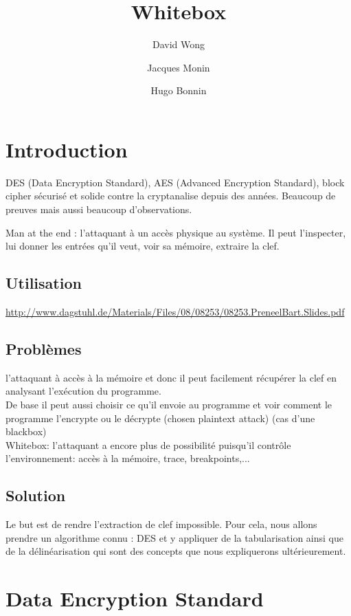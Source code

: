 \documentclass[a4paper,12pt]{article}
\author{David Wong
  \and Jacques Monin
  \and Hugo Bonnin}
\title{Whitebox}
\begin{document}
\maketitle
\newpage
\tableofcontents
\newpage


\section{Introduction}

DES (Data Encryption Standard), AES (Advanced Encryption Standard), block cipher sécurisé et solide contre la cryptanalise depuis des années. Beaucoup de preuves mais aussi beaucoup d'observations.

Man at the end : l'attaquant à un accès physique au système. Il peut l'inspecter, lui donner les entrées qu'il veut, voir sa mémoire, extraire la clef.
	
\subsection{Utilisation}

\url{http://www.dagstuhl.de/Materials/Files/08/08253/08253.PreneelBart.Slides.pdf}

\subsection{Problèmes}

l'attaquant à accès à la mémoire et donc il peut facilement récupérer la clef en analysant l'exécution du programme.\\
De base il peut aussi choisir ce qu'il envoie au programme et voir comment le programme l'encrypte ou le décrypte (chosen plaintext attack) (cas d'une blackbox)\\
Whitebox: l'attaquant a encore plus de possibilité puisqu'il contrôle l'environnement: accès à la mémoire, trace, breakpoints,...

\subsection{Solution}

Le but est de rendre l'extraction de clef impossible. Pour cela, nous allons prendre un algorithme connu : DES et y appliquer de la tabularisation ainsi que de la délinéarisation qui sont des concepts que nous expliquerons ultérieurement.

\newpage
	
\section{Data Encryption Standard}
\end{document}
